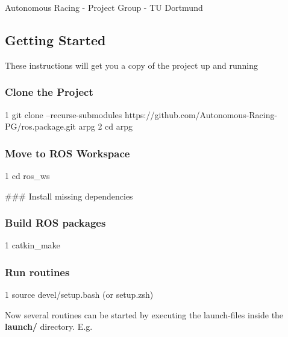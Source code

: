 Autonomous Racing -\/ Project Group -\/ TU Dortmund

\href{https://travis-ci.com/Autonomous-Racing-PG/ros.package}{\tt }

\subsection*{Getting Started}

These instructions will get you a copy of the project up and running

\subsubsection*{Clone the Project}


\begin{DoxyCode}
1 git clone --recurse-submodules https://github.com/Autonomous-Racing-PG/ros.package.git arpg
2 cd arpg
\end{DoxyCode}


\subsubsection*{Move to R\+OS Workspace}


\begin{DoxyCode}
1 cd ros\_ws
\end{DoxyCode}


\#\#\# Install missing dependencies 


\subsubsection*{Build R\+OS packages}


\begin{DoxyCode}
1 catkin\_make
\end{DoxyCode}


\subsubsection*{Run routines}


\begin{DoxyCode}
1 source devel/setup.bash (or setup.zsh)
\end{DoxyCode}


Now several routines can be started by executing the launch-\/files inside the {\bfseries launch/} directory. E.\+g.


